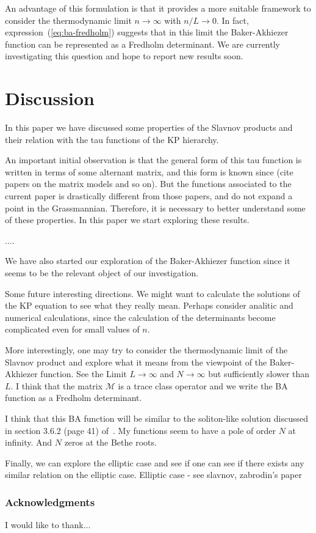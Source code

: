 \documentclass[a4paper,12pt]{amsart}
\begin{document}
An advantage of this formulation is that it provides a more suitable
framework to consider the thermodynamic limit \(n \to \infty\) with
\(n/L \to 0\). In fact, expression~(\ref{eq:ba-fredholm}) suggests
that in this limit the Baker-Akhiezer function can be represented as a
Fredholm determinant. We are currently investigating this question and
hope to report new results soon.



\section{Discussion}

In this paper we have discussed some properties of the Slavnov
products and their relation with the tau functions of the KP
hierarchy.

An important initial observation is that the general form of this tau
function is written in terms of some alternant matrix, and this form
is known since (cite papers on the matrix models and so on). But the
functions associated to the current paper is drastically different
from those papers, and do not expand a point in the
Grassmannian. Therefore, it is necessary to better understand some of
these properties. In this paper we start exploring these results.

....  

We have also started our exploration of the Baker-Akhiezer function since it seems to
be the relevant object of our investigation.  

Some future interesting directions. We might want to calculate the
solutions of the KP equation to see what they really mean. Perhaps
consider analitic and numerical calculations, since the calculation of
the determinants become complicated even for small values of \(n\).

More interestingly, one may try to consider the thermodynamic limit of
the Slavnov product and explore what it means from the viewpoint of
the Baker-Akhiezer function.  See the Limit \(L \to \infty\) and \(N
\to \infty\) but sufficiently slower than \(L\).  I think that the
matrix \(\mathcal{M}\) is a trace class operator and we write the BA
function as a Fredholm determinant.

I think that this BA function will be similar to the soliton-like
solution discussed in section 3.6.2 (page 41) of~\cite{Zabrodin2018}.
My functions seem to have a pole of order \(N\) at infinity. And \(N\)
zeros at the Bethe roots.

Finally, we can explore the elliptic case and see if one can see if
there exists any similar relation on the elliptic case.  Elliptic case
- see slavnov, zabrodin's paper



\subsubsection*{Acknowledgments}
I would like to thank...

\printbibliography
\end{document}
